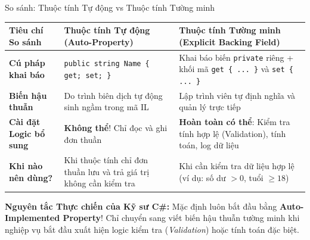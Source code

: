 \documentclass[aspectratio=169, 10pt]{beamer}
\begin{document}
\begin{frame}{So sánh: Thuộc tính Tự động vs Thuộc tính Tường minh}
  \begin{table}
    \centering\small
    \begin{tabularx}{\textwidth}{lXX}
      \toprule
      \textbf{Tiêu chí So sánh} & \textbf{Thuộc tính Tự động (Auto-Property)} & \textbf{Thuộc tính Tường minh (Explicit Backing Field)} \\
      \midrule
      \textbf{Cú pháp khai báo} & \texttt{public string Name \{ get; set; \}} & Khai báo biến \texttt{private} riêng + khối mã \texttt{get \{ ... \}} và \texttt{set \{ ... \}} \\
      \textbf{Biến hậu thuẫn} & Do trình biên dịch tự động sinh ngầm trong mã IL & Lập trình viên tự định nghĩa và quản lý trực tiếp \\
      \textbf{Cài đặt Logic bổ sung} & \textbf{Không thể}! Chỉ đọc và ghi đơn thuần & \textbf{Hoàn toàn có thể}: Kiểm tra tính hợp lệ (Validation), tính toán, log dữ liệu \\
      \textbf{Khi nào nên dùng?} & Khi thuộc tính chỉ đơn thuần lưu và trả giá trị không cần kiểm tra & Khi cần kiểm tra dữ liệu hợp lệ (ví dụ: số dư $> 0$, tuổi $\ge 18$) \\
      \bottomrule
    \end{tabularx}
  \end{table}
  \vspace{2mm}
  \begin{alertblock}{\textbf{Nguyên tắc Thực chiến của Kỹ sư C\#:}}
    Mặc định luôn bắt đầu bằng \textbf{Auto-Implemented Property}! Chỉ chuyển sang viết biến hậu thuẫn tường minh khi nghiệp vụ bắt đầu xuất hiện logic kiểm tra (\textit{Validation}) hoặc tính toán đặc biệt.
  \end{alertblock}
\end{frame}
\end{document}
